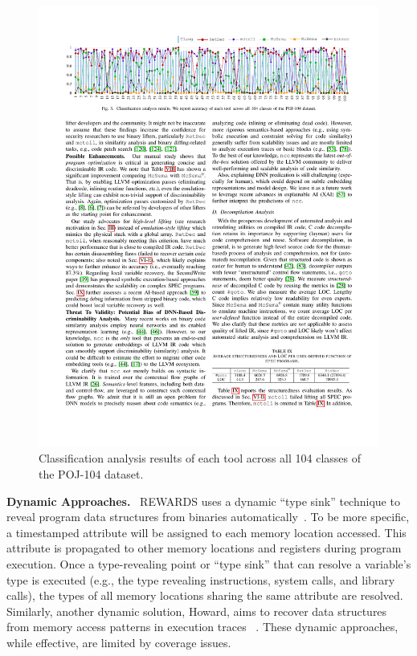 \begin{figure}[tb]
  \centering
  \includegraphics[width=1.0\textwidth]{fig/ncc.pdf}
  \caption{Classification analysis results of each tool across all 104 classes of the POJ-104 dataset.}
  \label{fig:ncc}
\end{figure}

\noindent\textbf{Dynamic Approaches.}~
REWARDS uses a dynamic ``type sink'' technique to reveal program data 
structures from binaries automatically~\cite{lin2010automatic}. To be more 
specific, a timestamped attribute will be assigned to each memory location 
accessed. This attribute is propagated to other memory locations and registers 
during program execution. Once a type-revealing point or ``type sink'' that can 
resolve a variable's type is executed (e.g., the type revealing instructions, 
system calls, and library calls), the types of all memory locations sharing the 
same attribute are resolved. Similarly, another dynamic solution, Howard, aims 
to recover data structures from memory access patterns in execution traces
~\cite{slowinska2011howard}. These dynamic approaches, while effective, are 
limited by coverage issues.

